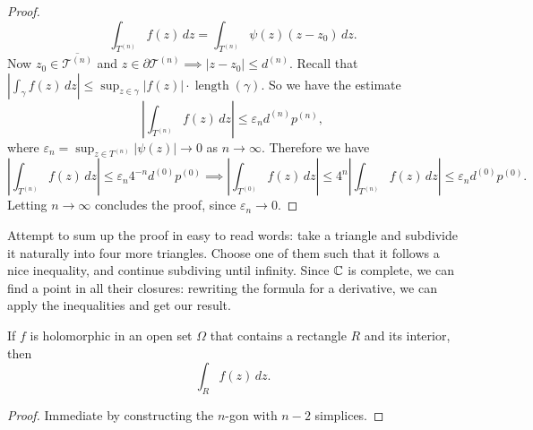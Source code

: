 \begin{proof}
\[\int_{T^{(n)}}^{} f(z) \, dz = \int_{T^{(n)}}^{} \psi(z)(z-z_0) \, dz.
\] Now $z_0\in \overline{\mathcal{T} ^{(n)}}$ and $z\in \partial \mathcal{T} ^{(n)}\implies |z-z_0|\leq d^{(n)}$. Recall that $\left| \int_{\gamma}^{} f(z) \, dz \right| \leq \sup_{z\in \gamma}|f(z)|\cdot \operatorname{length}(\gamma)$. So we have the estimate \[
\left| \int_{T^{(n)}}^{} f(z) \, dz \right| \leq \varepsilon _n d^{(n)}p^{(n)},
\] where $\varepsilon _n =\sup_{z\in T^{(n)}}|\psi(z)|\to 0$ as $n\to \infty$. Therefore we have \[
\left| \int_{T^{(n)}}^{} f(z) \, dz \right| \leq\varepsilon _n 4^{-n}d^{(0)}p^{(0)}
\implies \left| \int_{T^{(0)}}^{} f(z) \, dz \right| \leq 4^n  \left| \int_{T^{(n)}}^{} f(z) \, dz \right| \leq \varepsilon _n d^{(0)}p^{(0)}.
\] Letting $n\to \infty$ concludes the proof, since $\varepsilon _n \to 0$.
\end{proof}
Attempt to sum up the proof in easy to read words: take a triangle and subdivide it naturally into four more triangles. Choose one of them such that it follows a nice inequality, and continue subdiving until infinity. Since $\mathbb{C}$ is complete, we can find a point in all their closures: rewriting the formula for a derivative, we can apply the inequalities and get our result.
\begin{cor}
    If $f$ is holomorphic in an open set $\Omega$ that contains a rectangle $R$ and its interior, then \[
        \int_{R}^{} f(z) \, dz.
    \] 
\end{cor}
\begin{proof}
    Immediate by constructing the $n$-gon with $n-2$ simplices.
\end{proof}

